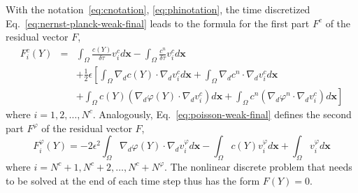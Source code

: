 With the notation~\eqref{eq:cnotation}, \eqref{eq:phinotation}, the time discretized 
Eq.~\eqref{eq:nernst-planck-weak-final} leads to the formula for the 
first part $F^c$ of the residual vector $F$,
\begin{eqnarray}
  F_i^c\left(Y\right) & = & \int_{\Omega} \frac{c(Y)}{\delta\tau}v_i^c d\mathbf{x} - 
  \int_{\Omega} \frac{c^{n}}{\delta\tau}v_i^c d\mathbf{x}\nonumber\\
  &&+\frac 12 \epsilon \left[\int_{\Omega} \nabla_d c(Y) \cdot \nabla_d v_i^c d\mathbf{x}+ 
  	\int_{\Omega} \nabla_d c^{n} \cdot \nabla_d v_i^c d\mathbf{x}\right.\nonumber\\
  &&+ \left.\int_{\Omega}c(Y) \left(\nabla_d \varphi(Y) \cdot \nabla_d v_i^c\right) d\mathbf{x}+
  \int_{\Omega}c^{n} \left(\nabla_d \varphi^{n} \cdot \nabla_d v_i^c\right) d\mathbf{x}\right]\label{eq:Fc}
\end{eqnarray}
where $i = 1, 2, \ldots, N^c$.
Analogously, Eq.~\eqref{eq:poisson-weak-final} defines the second part $F^{\varphi}$ 
of the residual vector $F$,
\begin{equation}
  F_i^{\varphi}\left(Y\right) = -2\epsilon^2\int_{\Omega} \nabla_d \varphi(Y) \cdot \nabla_d v_i^{\varphi} d\mathbf{x} 
  - \int_{\Omega} c(Y)v_i^{\varphi} d\mathbf{x} + \int_{\Omega} v_i^{\varphi} d\mathbf{x}
  \label{eq:Fphi}
\end{equation}
where $i = N^c + 1, N^c + 2, \ldots, N^c + N^{\varphi}$. The nonlinear discrete problem 
that needs to be solved at the end of each time step thus has the form 
$F(Y) = 0$.


